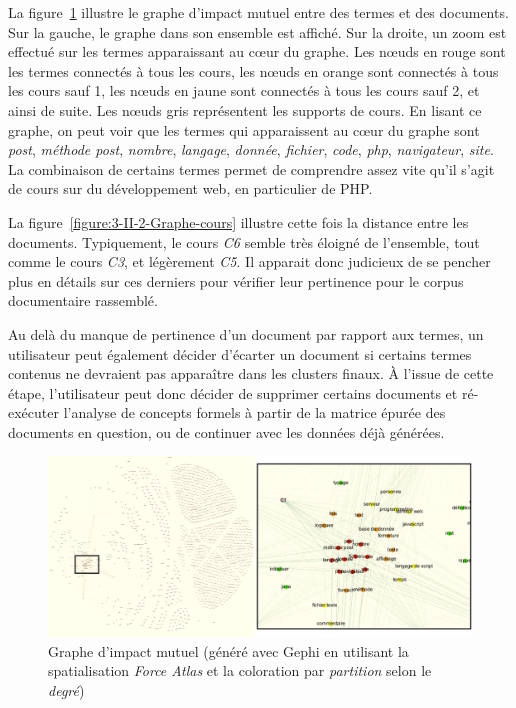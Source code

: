 La figure~\ref{figure:3-II-2-Graphe-zoom} illustre le graphe d'impact mutuel entre des termes et des documents.
Sur la gauche, le graphe dans son ensemble est affiché.
Sur la droite, un zoom est effectué sur les termes apparaissant au c\oe{}ur du graphe.
Les n\oe{}uds en rouge sont les termes connectés à tous les cours, les n\oe{}uds en orange sont connectés à tous les cours sauf 1, les n\oe{}uds en jaune sont connectés à tous les cours sauf 2, et ainsi de suite.
Les n\oe{}uds gris représentent les supports de cours.
En lisant ce graphe, on peut voir que les termes qui apparaissent au c\oe{}ur du graphe sont \textit{post}, \textit{méthode post}, \textit{nombre}, \textit{langage}, \textit{donnée}, \textit{fichier}, \textit{code}, \textit{php}, \textit{navigateur}, \textit{site}.
La combinaison de certains termes permet de comprendre assez vite qu'il s'agit de cours sur du développement web, en particulier de PHP.


La figure~\ref{figure:3-II-2-Graphe-cours} illustre cette fois la distance entre les documents.
Typiquement, le cours \textit{C6} semble très éloigné de l'ensemble, tout comme le cours \textit{C3}, et légèrement \textit{C5}.
Il apparait donc judicieux de se pencher plus en détails sur ces derniers pour vérifier leur pertinence pour le corpus documentaire rassemblé.



Au delà du manque de pertinence d'un document par rapport aux termes, un utilisateur peut également décider d'écarter un document si certains termes contenus ne devraient pas apparaître dans les clusters finaux.
À l'issue de cette étape, l'utilisateur peut donc décider de supprimer certains documents et ré-exécuter l'analyse de concepts formels à partir de la matrice épurée des documents en question, ou de continuer avec les données déjà générées.


\newpage


\begin{figure}[ht!]
\centering
\centerline{  %
\includegraphics[scale=0.6]{3-Methode-CREA/images/2-analyse-structurelle/exemple_graphe.png}
}
\caption{Graphe d'impact mutuel (généré avec Gephi en utilisant la spatialisation \textit{Force Atlas} et la coloration par \textit{partition} selon le \textit{degré})}
\label{figure:3-II-2-Graphe-zoom}
\end{figure}


